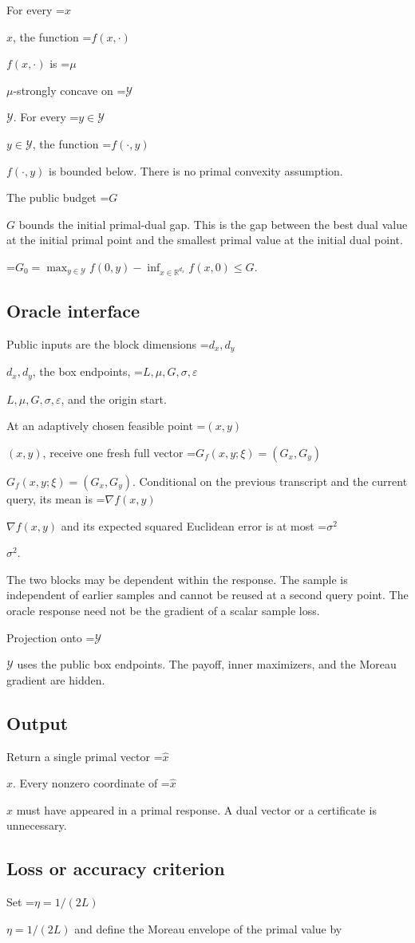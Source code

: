 \documentclass[10pt,a4paper]{article}
\newcommand{\AtlasMath}[1]{\par\begingroup\centering\setbox0=\hbox{$\displaystyle #1$}\ifdim\wd0>1.4\linewidth\typeout{ATLAS WIDE FORMULA: \the\wd0}\fi\ifdim\wd0>\linewidth\resizebox{\linewidth}{!}{\box0}\else\box0\fi\par\endgroup}
\newcommand{\AtlasInlineMath}[1]{\begingroup\setbox0=\hbox{$#1$}\ifdim\wd0>.4\linewidth\endgroup\AtlasMath{#1}\else\endgroup$#1$\fi}
\begin{document}
For every \AtlasInlineMath{x}, the function \AtlasInlineMath{f(x,\cdot)} is \AtlasInlineMath{\mu}-strongly concave on \AtlasInlineMath{\mathcal Y}. For every \AtlasInlineMath{y\in\mathcal Y}, the function \AtlasInlineMath{f(\cdot,y)} is bounded below. There is no primal convexity assumption.

The public budget \AtlasInlineMath{G} bounds the initial primal-dual gap. This is the gap between the best dual value at the initial primal point and the smallest primal value at the initial dual point.


\AtlasMath{G_0=\max_{y\in\mathcal Y}f(0,y)-\inf_{x\in\mathbb R^{d_x}}f(x,0)\le G.}


\subsection{Oracle interface}
Public inputs are the block dimensions \AtlasInlineMath{d_x,d_y}, the box endpoints, \AtlasInlineMath{L,\mu,G,\sigma,\varepsilon}, and the origin start.

At an adaptively chosen feasible point \AtlasInlineMath{(x,y)}, receive one fresh full vector \AtlasInlineMath{G_f(x,y;\xi)=(G_x,G_y)}. Conditional on the previous transcript and the current query, its mean is \AtlasInlineMath{\nabla f(x,y)} and its expected squared Euclidean error is at most \AtlasInlineMath{\sigma^2}.

The two blocks may be dependent within the response. The sample is independent of earlier samples and cannot be reused at a second query point. The oracle response need not be the gradient of a scalar sample loss.

Projection onto \AtlasInlineMath{\mathcal Y} uses the public box endpoints. The payoff, inner maximizers, and the Moreau gradient are hidden.

\subsection{Output}
Return a single primal vector \AtlasInlineMath{\widehat x}. Every nonzero coordinate of \AtlasInlineMath{\widehat x} must have appeared in a primal response. A dual vector or a certificate is unnecessary.

\subsection{Loss or accuracy criterion}
Set \AtlasInlineMath{\eta=1/(2L)} and define the Moreau envelope of the primal value by
\end{document}
